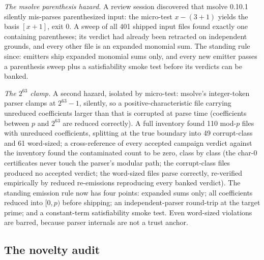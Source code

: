 \documentclass[11pt]{article}
\theoremstyle{definition}
\theoremstyle{remark}
\begin{document}
\emph{The msolve parenthesis hazard.} A review session discovered that msolve 0.10.1 silently mis-parses parenthesized input: the micro-test $x-(3+1)$ yields the basis $[x+1]$, exit 0. A sweep of all 401 shipped input files found exactly one containing parentheses; its verdict had already been retracted on independent grounds, and every other file is an expanded monomial sum. The standing rule since: emitters ship expanded monomial sums only, and every new emitter passes a parenthesis sweep plus a satisfiability smoke test before its verdicts can be banked.

\emph{The $2^{63}$ clamp.} A second hazard, isolated by micro-test: msolve's integer-token parser clamps at $2^{63}-1$, silently, so a positive-characteristic file carrying unreduced coefficients larger than that is corrupted at parse time (coefficients between $p$ and $2^{63}$ are reduced correctly). A full inventory found 110 mod-$p$ files with unreduced coefficients, splitting at the true boundary into 49 corrupt-class and 61 word-sized; a cross-reference of every accepted campaign verdict against the inventory found the contaminated count to be zero, class by class (the char-$0$ certificates never touch the parser's modular path; the corrupt-class files produced no accepted verdict; the word-sized files parse correctly, re-verified empirically by reduced re-emissions reproducing every banked verdict). The standing emission rule now has four points: expanded sums only; all coefficients reduced into $[0,p)$ before shipping; an independent-parser round-trip at the target prime; and a constant-term satisfiability smoke test. Even word-sized violations are barred, because parser internals are not a trust anchor.

\subsection{The novelty audit}\label{sec:novelty}
\end{document}
